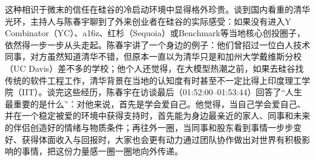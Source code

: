 \documentclass[UTF8,a4paper,11pt,fontset=fandol]{ctexart}
\begin{document}
这种相识于微末的信任在硅谷的冷启动环境中显得格外珍贵。谈到国内看重的清华光环，主持人与陈春宇聊到了外来创业者在硅谷的实际感受：如果没有进入Y Combinator（YC）、a16z、红杉（Sequoia）或Benchmark等当地核心创投圈子，依然得一步一步从头走起。陈春宇讲了一个身边的例子：他们曾招过一位白人技术同事，对方虽然知道清华不错，但原本一直以为清华只是和加州大学戴维斯分校（UC Davis）差不多的学校；他个人还觉得，在大模型热潮之前，如果去硅谷找传统的软件工程工作，清华背景在当地的认知度有时甚至不一定比得上印度理工学院（IIT）。谈完这些经历，陈春宇在访谈最后（01:52:00–01:53:44）回答了“人生最重要的是什么”：对他来说，首先是学会爱自己。他觉得，当自己学会爱自己、并在一个稳定被爱的环境中获得支持时，首先能为身边最亲近的家人、同事和未来的伴侣创造好的情绪与物质条件；再往外一圈，当同事和股东看到事情一步步变好、获得体面收入与回报时，大家也会更有动力通过团队协作做出对世界有积极影响的事情，把这份力量感一圈一圈地向外传递。
\end{document}
